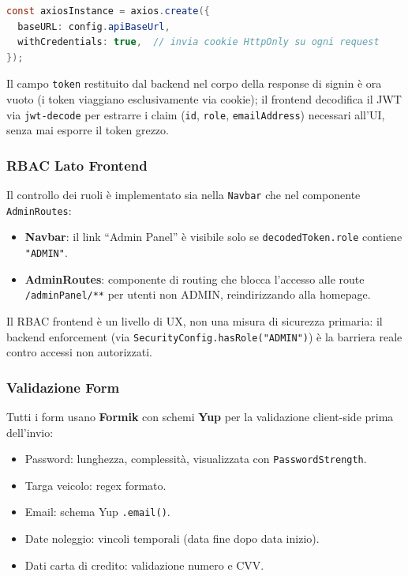 \documentclass[12pt, a4paper]{article}
\begin{document}
    \begin{lstlisting}[language=Java, caption={axiosInterceptors.ts --- configurazione Axios}]
const axiosInstance = axios.create({
  baseURL: config.apiBaseUrl,
  withCredentials: true,  // invia cookie HttpOnly su ogni request
});
    \end{lstlisting}

    Il campo \texttt{token} restituito dal backend nel corpo della response di signin
    è ora vuoto (i token viaggiano esclusivamente via cookie); il frontend decodifica
    il JWT via \texttt{jwt-decode} per estrarre i claim (\texttt{id}, \texttt{role},
    \texttt{emailAddress}) necessari all'UI, senza mai esporre il token grezzo.

    \subsubsection*{RBAC Lato Frontend}

    Il controllo dei ruoli è implementato sia nella \texttt{Navbar} che nel componente
    \texttt{AdminRoutes}:

    \begin{itemize}
        \item \textbf{Navbar}: il link ``Admin Panel'' è visibile solo se
        \texttt{decodedToken.role} contiene \texttt{"ADMIN"}.
        \item \textbf{AdminRoutes}: componente di routing che blocca l'accesso alle
        route \texttt{/adminPanel/**} per utenti non ADMIN, reindirizzando alla
        homepage.
    \end{itemize}

    Il RBAC frontend è un livello di UX, non una misura di sicurezza primaria:
    il backend enforcement (via \texttt{SecurityConfig.hasRole("ADMIN")}) è la
    barriera reale contro accessi non autorizzati.

    \subsubsection*{Validazione Form}

    Tutti i form usano \textbf{Formik} con schemi \textbf{Yup} per la validazione
    client-side prima dell'invio:
    \begin{itemize}
        \item Password: lunghezza, complessità, visualizzata con \texttt{PasswordStrength}.
        \item Targa veicolo: regex formato.
        \item Email: schema Yup \texttt{.email()}.
        \item Date noleggio: vincoli temporali (data fine dopo data inizio).
        \item Dati carta di credito: validazione numero e CVV.
    \end{itemize}
\end{document}
